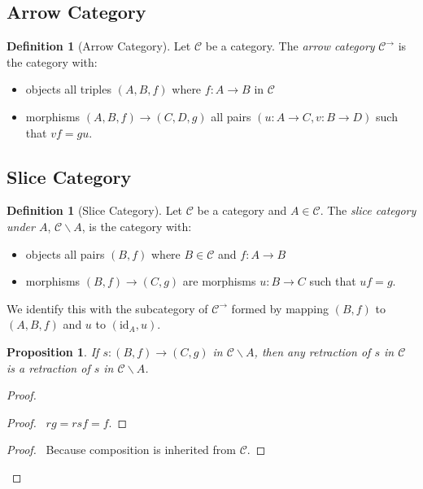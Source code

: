 \documentclass{book}
\let\qed\relax
\newtheorem{prop}[ax]{Proposition}
\theoremstyle{definition}
\newtheorem{df}[ax]{Definition}
\newcommand{\id}[1]{\ensuremath{\mathrm{id}_{#1}}}
\begin{document}
\subsection{Arrow Category}

\begin{df}[Arrow Category]
Let $\mathcal{C}$ be a category. The \emph{arrow category} $\mathcal{C}^\rightarrow$ is the category with:
\begin{itemize}
\item objects all triples $(A,B,f)$ where $f : A \rightarrow B$ in $\mathcal{C}$
\item morphisms $(A,B,f) \rightarrow (C,D,g)$ all pairs $(u : A \rightarrow C, v : B \rightarrow D)$ such that $vf=gu$.
\end{itemize}
\end{df}

\subsection{Slice Category}

\begin{df}[Slice Category]
Let $\mathcal{C}$ be a category and $A \in \mathcal{C}$. The \emph{slice category under $A$}, $\mathcal{C} \backslash A$, is the category with:
\begin{itemize}
\item objects all pairs $(B,f)$ where $B \in \mathcal{C}$ and $f : A \rightarrow B$
\item morphisms $(B,f) \rightarrow (C,g)$ are morphisms $u : B \rightarrow C$ such that $uf=g$.
\end{itemize}

We identify this with the subcategory of $\mathcal{C}^\rightarrow$ formed by mapping $(B,f)$ to $(A,B,f)$ and $u$ to $(\id{A},u)$.
\end{df}

\begin{prop}
\label{prop:retraction_in_slice}
If $s : (B,f) \rightarrow (C,g)$ in $\mathcal{C} \backslash A$, then any retraction of $s$ in $\mathcal{C}$ is a retraction of $s$ in $\mathcal{C} \backslash A$.
\end{prop}

\begin{proof}
\pf
{}
\begin{proof}
	\pf\ $rg = rsf = f$.
\end{proof}
\step{4}{$rs = \id{(B,f)}$}
\begin{proof}
	\pf\ Because composition is inherited from $\mathcal{C}$.
\end{proof}
\qed
\end{proof}
\end{document}
